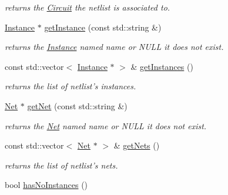 \begin{DoxyCompactItemize}
\begin{DoxyCompactList}\small\item\em returns the \hyperlink{class_open_chams_1_1_circuit}{Circuit} the netlist is associated to. \end{DoxyCompactList}\item 
\hyperlink{class_open_chams_1_1_instance}{Instance} $\ast$ \hyperlink{class_open_chams_1_1_netlist_a6fbcd8c819bd0b576398ac031c2726fc}{get\-Instance} (const std\-::string \&)
\begin{DoxyCompactList}\small\item\em returns the \hyperlink{class_open_chams_1_1_instance}{Instance} named {\ttfamily name} or N\-U\-L\-L it does not exist. \end{DoxyCompactList}\item 
\hypertarget{class_open_chams_1_1_netlist_a8e6e58ffab876152a740092520c35d73}{const std\-::vector$<$ \hyperlink{class_open_chams_1_1_instance}{Instance} $\ast$ $>$ \& \hyperlink{class_open_chams_1_1_netlist_a8e6e58ffab876152a740092520c35d73}{get\-Instances} ()}\label{class_open_chams_1_1_netlist_a8e6e58ffab876152a740092520c35d73}

\begin{DoxyCompactList}\small\item\em returns the list of netlist's instances. \end{DoxyCompactList}\item 
\hyperlink{class_open_chams_1_1_net}{Net} $\ast$ \hyperlink{class_open_chams_1_1_netlist_a18b468cdde5adf75e3057c8558972f52}{get\-Net} (const std\-::string \&)
\begin{DoxyCompactList}\small\item\em returns the \hyperlink{class_open_chams_1_1_net}{Net} named {\ttfamily name} or N\-U\-L\-L it does not exist. \end{DoxyCompactList}\item 
\hypertarget{class_open_chams_1_1_netlist_abf36db82efb99a8ec8ae4b454be00019}{const std\-::vector$<$ \hyperlink{class_open_chams_1_1_net}{Net} $\ast$ $>$ \& \hyperlink{class_open_chams_1_1_netlist_abf36db82efb99a8ec8ae4b454be00019}{get\-Nets} ()}\label{class_open_chams_1_1_netlist_abf36db82efb99a8ec8ae4b454be00019}

\begin{DoxyCompactList}\small\item\em returns the list of netlist's nets. \end{DoxyCompactList}\item 
\hypertarget{class_open_chams_1_1_netlist_adab62a25face462baec9a7fffb2b6158}{bool \hyperlink{class_open_chams_1_1_netlist_adab62a25face462baec9a7fffb2b6158}{has\-No\-Instances} ()}\label{class_open_chams_1_1_netlist_adab62a25face462baec9a7fffb2b6158}


\end{DoxyCompactItemize}
